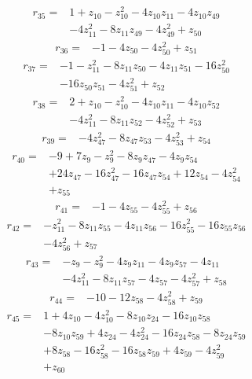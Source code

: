 \begin{align*}
r_{35}={}&1 +z_{10} -z_{10}^{2} -4z_{10}z_{11} -4z_{10}z_{49}\\
&-4z_{11}^{2} -8z_{11}z_{49} -4z_{49}^{2} +z_{50}
\end{align*}
\begin{align*}
r_{36}={}&-1 -4z_{50} -4z_{50}^{2} +z_{51}
\end{align*}
\begin{align*}
r_{37}={}&-1 -z_{11}^{2} -8z_{11}z_{50} -4z_{11}z_{51} -16z_{50}^{2}\\
&-16z_{50}z_{51} -4z_{51}^{2} +z_{52}
\end{align*}
\begin{align*}
r_{38}={}&2 +z_{10} -z_{10}^{2} -4z_{10}z_{11} -4z_{10}z_{52}\\
&-4z_{11}^{2} -8z_{11}z_{52} -4z_{52}^{2} +z_{53}
\end{align*}
\begin{align*}
r_{39}={}&-4z_{47}^{2} -8z_{47}z_{53} -4z_{53}^{2} +z_{54}
\end{align*}
\begin{align*}
r_{40}={}&-9 +7z_{9} -z_{9}^{2} -8z_{9}z_{47} -4z_{9}z_{54}\\
&+24z_{47} -16z_{47}^{2} -16z_{47}z_{54} +12z_{54} -4z_{54}^{2}\\
&+z_{55}
\end{align*}
\begin{align*}
r_{41}={}&-1 -4z_{55} -4z_{55}^{2} +z_{56}
\end{align*}
\begin{align*}
r_{42}={}&-z_{11}^{2} -8z_{11}z_{55} -4z_{11}z_{56} -16z_{55}^{2} -16z_{55}z_{56}\\
&-4z_{56}^{2} +z_{57}
\end{align*}
\begin{align*}
r_{43}={}&-z_{9} -z_{9}^{2} -4z_{9}z_{11} -4z_{9}z_{57} -4z_{11}\\
&-4z_{11}^{2} -8z_{11}z_{57} -4z_{57} -4z_{57}^{2} +z_{58}
\end{align*}
\begin{align*}
r_{44}={}&-10 -12z_{58} -4z_{58}^{2} +z_{59}
\end{align*}
\begin{align*}
r_{45}={}&1 +4z_{10} -4z_{10}^{2} -8z_{10}z_{24} -16z_{10}z_{58}\\
&-8z_{10}z_{59} +4z_{24} -4z_{24}^{2} -16z_{24}z_{58} -8z_{24}z_{59}\\
&+8z_{58} -16z_{58}^{2} -16z_{58}z_{59} +4z_{59} -4z_{59}^{2}\\
&+z_{60}
\end{align*}
